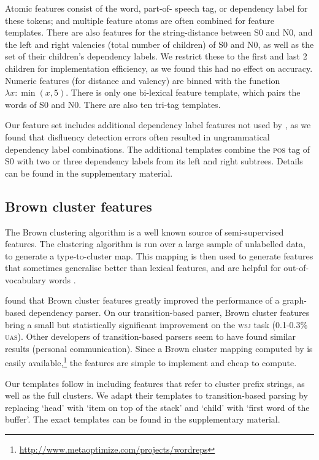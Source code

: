 \documentclass[11pt,letterpaper]{article}
\newcommand{\pos}{\textsc{pos}\xspace}
\newcommand{\szero}{S0\xspace}
\newcommand{\nzero}{N0\xspace}
\begin{document}
Atomic features consist of the word, part-of- speech tag, or dependency label
for these tokens; and multiple feature atoms are often combined for feature
templates. There are also features for the string-distance between \szero
and \nzero, and the left and right valencies
(total number of children) of \szero and \nzero, as well as the set of their children's
dependency labels. We restrict these
to the first and last 2 children for implementation efficiency, as we found this
had no effect on accuracy. Numeric features (for distance and valency) are binned
with the function $\lambda x: \min(x, 5)$.
There is only one bi-lexical feature template, which pairs
the words of \szero and \nzero.
There are also ten tri-tag templates.

Our feature set includes additional dependency label features not used by \citet{zhang:11},
as we found that disfluency detection errors often resulted in ungrammatical
dependency label combinations.  The additional templates combine the \pos tag of \szero with
two or three dependency labels from its left and right subtrees.  Details can be found in
the supplementary material.

\subsection{Brown cluster features}
\label{sec:browns}

The Brown clustering algorithm \citep{brown:92} is a well known source
of semi-supervised features. The clustering algorithm is run over a large sample
of unlabelled data, to generate a type-to-cluster map. This mapping is then used
to generate features that sometimes generalise better than lexical features,
and are helpful for out-of-vocabulary words \citep{turian:10}.

\citet{koo:10} found that Brown cluster features greatly improved the performance
of a graph-based dependency parser. On our transition-based parser, Brown cluster
features bring a small but statistically significant improvement on the \textsc{wsj}
task (0.1-0.3\% \textsc{uas}).  Other developers of transition-based parsers
seem to have found similar results (personal communication).
Since a Brown cluster mapping computed by \citet{liang:05} is easily
available,\footnote{\tiny \url{http://www.metaoptimize.com/projects/wordreps}} the features
are simple to implement and cheap to compute.

Our templates follow \citet{koo:10} in including features that refer to cluster
prefix strings, as well as the full clusters.
We adapt their templates to transition-based parsing
by replacing `head' with `item on top of the stack' and `child' with `first word
of the buffer'. The exact templates can be found in the supplementary material.
\end{document}

